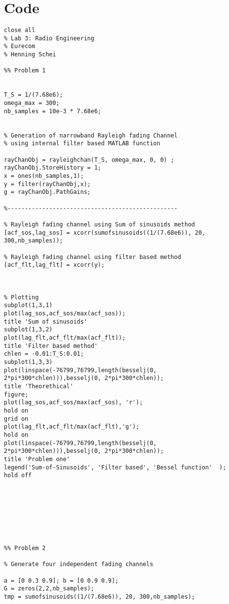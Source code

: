 \documentclass{article}
\begin{document}

\section{Code}

\begin{lstlisting}
close all 
% Lab 3: Radio Engineering
% Eurecom
% Henning Schei

%% Problem 1 


T_S = 1/(7.68e6);
omega_max = 300;
nb_samples = 10e-3 * 7.68e6;


% Generation of narrowband Rayleigh fading Channel
% using internal filter based MATLAB function

rayChanObj = rayleighchan(T_S, omega_max, 0, 0) ;
rayChanObj.StoreHistory = 1;
x = ones(nb_samples,1);
y = filter(rayChanObj,x);
g = rayChanObj.PathGains;

%-------------------------------------------------

% Rayleigh fading channel using Sum of sinusoids method
[acf_sos,lag_sos] = xcorr(sumofsinusoids((1/(7.68e6)), 20, 300,nb_samples));

% Rayleigh fading channel using filter based method
[acf_flt,lag_flt] = xcorr(y);



% Plotting
subplot(1,3,1)
plot(lag_sos,acf_sos/max(acf_sos));
title 'Sum of sinusoids'
subplot(1,3,2)
plot(lag_flt,acf_flt/max(acf_flt));
title 'Filter based method'
chlen = -0.01:T_S:0.01;
subplot(1,3,3)
plot(linspace(-76799,76799,length(besselj(0, 2*pi*300*chlen))),besselj(0, 2*pi*300*chlen));
title 'Theorethical'
figure; 
plot(lag_sos,acf_sos/max(acf_sos), 'r');
hold on
grid on
plot(lag_flt,acf_flt/max(acf_flt),'g');
hold on
plot(linspace(-76799,76799,length(besselj(0, 2*pi*300*chlen))),besselj(0, 2*pi*300*chlen));
title 'Problem one'
legend('Sum-of-Sinusoids', 'Filter based', 'Bessel function'  );
hold off








%% Problem 2

% Generate four independent fading channels 

a = [0 0.3 0.9]; b = [0 0.9 0.9];
G = zeros(2,2,nb_samples);
tmp = sumofsinusoids((1/(7.68e6)), 20, 300,nb_samples);


\end{lstlisting}
\end{document}
